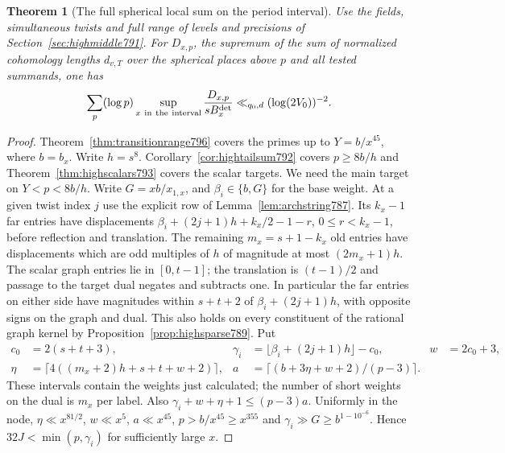 \documentclass[a4paper,11pt]{article}
\newtheorem{theorem}[proposition]{Theorem}
\theoremstyle{definition}
\theoremstyle{remark}
\numberwithin{equation}{section}
\begin{document}
\begin{theorem}[The full spherical local sum on the period interval]
\leavevmode\label{thm:allspherical798}
Use the fields, simultaneous twists and full range of
levels and precisions of Section~\ref{sec:highmiddle791}.
For \(D_{x,p}\), the supremum of the sum of normalized
cohomology lengths \(d_{v,T}\) over the spherical places
above \(p\) and all tested summands, one has
\[
       \sum_p (\log p)\sup_{x\ {\rm in\ the\ interval}}
                  \frac{D_{x,p}}{sB_x^{\rm det}}
                      \ll_{q_0,d}(\log(2V_0))^{-2}.
\]
\end{theorem}
\begin{proof}
Theorem~\ref{thm:transitionrange796} covers the primes
up to \(Y=b/x^{45}\), where \(b=b_x\). Write \(h=s^8\).
Corollary~\ref{cor:hightailsum792} covers \(p\ge 8b/h\)
and Theorem~\ref{thm:highscalars793} covers the scalar
targets. We need the main target on \(Y<p<8b/h\).
Write \(G=xb/x_{1,x}\), and \(\beta_i\in\{b,G\}\) for the
base weight. At a given twist index \(j\) use the explicit
row of Lemma~\ref{lem:archstring787}. Its \(k_x-1\) far
entries have displacements \(\beta_i+(2j+1)h+k_x/2-1-r\),
\(0\le r<k_x-1\), before reflection and translation.
The remaining \(m_x=s+1-k_x\) old entries have displacements
which are odd multiples of \(h\) of magnitude at most
\((2m_x+1)h\). The scalar graph entries lie in
\([0,t-1]\); the translation is \((t-1)/2\) and passage
to the target dual negates and subtracts one. In particular
the far entries on either side have magnitudes within
\(s+t+2\) of \(\beta_i+(2j+1)h\), with opposite signs
on the graph and dual. This also holds on every constituent
of the rational graph kernel by
Proposition~\ref{prop:highsparse789}. Put
\[
 \begin{aligned}
 c_0&=2(s+t+3),&
 \gamma_i&=\lfloor\beta_i+(2j+1)h\rfloor-c_0,&
 w&=2c_0+3,\\
 \eta&=\lceil 4((m_x+2)h+s+t+w+2)\rceil,&
 a&=\lceil(b+3\eta+w+2)/(p-3)\rceil .
 \end{aligned}
\]
These intervals contain the weights just calculated; the
number of short weights on the dual is \(m_x\) per label.
Also \(\gamma_i+w+\eta+1\le(p-3)a\). Uniformly in the
node, \(\eta\ll x^{81/2}\), \(w\ll x^5\), \(a\ll x^{45}\),
\(p> b/x^{45}\ge x^{355}\) and
\(\gamma_i\gg G\ge b^{1-10^{-6}}\). Hence \(32J<\min(p,\gamma_i)\)
for sufficiently large \(x\).


\end{proof}
\end{document}

